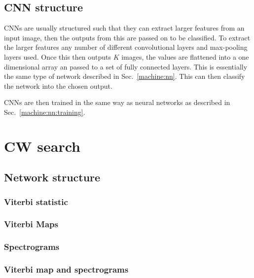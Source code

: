 \subsection{CNN structure}

\acp{CNN} are usually structured such that they can extract larger features from an input image, then the outputs from this are passed on to be classified.
To extract the larger features any number of different convolutional layers and max-pooling layers used.
Once this then outputs $K$ images, the values are flattened into a one dimensional array an passed to a set of fully connected layers. 
This is essentially the same type of network described in Sec.~\ref{machine:nn}.
This can then classify the network into the chosen output.

\acp{CNN} are then trained in the same way as neural networks as described in Sec.~\ref{machine:nn:training}.

\section{CW search}




\subsection{Network structure}

\subsubsection{Viterbi statistic}

\subsubsection{Viterbi Maps}

\subsubsection{Spectrograms}

\subsubsection{Viterbi map and spectrograms}

